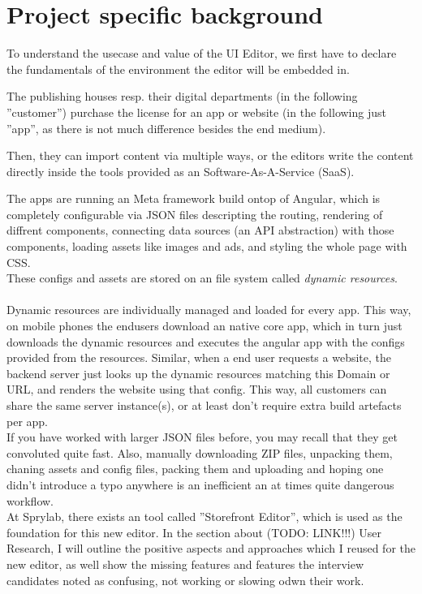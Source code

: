 \section{Project specific background}
To understand the usecase and value of the UI Editor, we first have to declare the fundamentals of the environment the editor will be embedded in.

The publishing houses resp. their digital departments (in the following ''customer'') purchase the license for an app or website (in the following just ''app'', as there is not much difference besides the end medium).

Then, they can import content via multiple ways, or the editors write the content directly inside the tools provided as an Software-As-A-Service (SaaS).

The apps are running an Meta framework build ontop of Angular, which is completely configurable via JSON files descripting the routing, rendering of diffrent components,
connecting data sources (an API abstraction) with those components, loading assets like images and ads, and styling the whole page with CSS.
\\
These configs and assets are stored on an file system called \label{def:DynamicResources} \textit{dynamic resources}.
\\\\
Dynamic resources are individually managed and loaded for every app. This way, on mobile phones the endusers download an native core app, which in turn just downloads the dynamic resources and executes the angular app with the configs provided from the resources.
Similar, when a end user requests a website, the backend server just looks up the dynamic resources matching this Domain or URL, and renders the website using that config.
This way, all customers can share the same server instance(s), or at least don't require extra build artefacts per app.
\\
If you have worked with larger JSON files before, you may recall that they get convoluted quite fast.
Also, manually downloading ZIP files, unpacking them, chaning assets and config files, packing them and uploading and hoping one didn't introduce a typo anywhere is an inefficient an at times quite dangerous workflow.
\\
At Sprylab, there exists an tool called ''Storefront Editor'', which is used as the foundation for this new editor.
In the section about (TODO: LINK!!!) User Research, I will outline the positive aspects and approaches which I reused for the new editor,
as well show the missing features and features the interview candidates noted as confusing, not working or slowing odwn their work.

